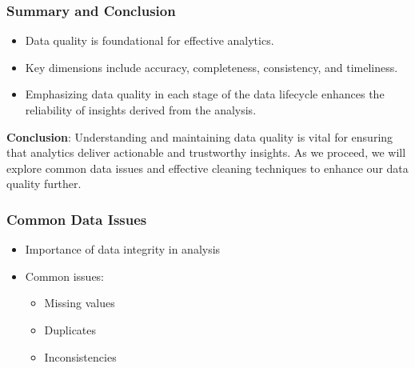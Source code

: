 \documentclass[aspectratio=169]{beamer}
\begin{document}
\begin{frame}[fragile]
    \frametitle{Summary and Conclusion}
    \begin{itemize}
        \item Data quality is foundational for effective analytics.
        \item Key dimensions include accuracy, completeness, consistency, and timeliness.
        \item Emphasizing data quality in each stage of the data lifecycle enhances the reliability of insights derived from the analysis.
    \end{itemize}
    
    \textbf{Conclusion}: Understanding and maintaining data quality is vital for ensuring that analytics deliver actionable and trustworthy insights. As we proceed, we will explore common data issues and effective cleaning techniques to enhance our data quality further.
\end{frame}

\begin{frame}[fragile]
    \frametitle{Common Data Issues}
    \begin{itemize}
        \item Importance of data integrity in analysis
        \item Common issues:
        \begin{itemize}
            \item Missing values
            \item Duplicates
            \item Inconsistencies
        \end{itemize}
    \end{itemize}
\end{frame}
\end{document}
